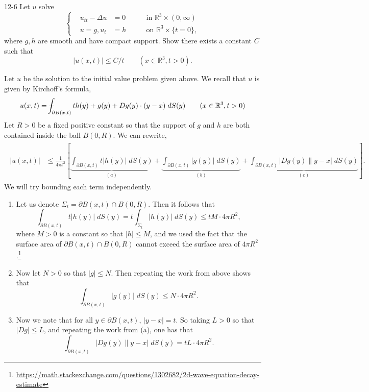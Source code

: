 \documentclass{article}
\def\Xint#1{\mathchoice
	{\XXint\displaystyle\textstyle{#1}}%
	{\XXint\textstyle\scriptstyle{#1}}%
	{\XXint\scriptstyle\scriptscriptstyle{#1}}%
	{\XXint\scriptscriptstyle\scriptscriptstyle{#1}}%
	\!\int}
\def\XXint#1#2#3{{\setbox0=\hbox{$#1{#2#3}{\int}$ }
		\vcenter{\hbox{$#2#3$ }}\kern-0.6\wd0}}
\def\dashint{\Xint-}
\numberwithin{equation}{section}
\begin{document}
	\begin{prb}{12-6}
		Let $u$ solve 
		\begin{equation*}
			\left\{
			\begin{alignedat}{3}
				&u_{tt} - \Delta u &=0 &\qquad \text{in $\mathbb{R}^3 \times (0,\infty)$} \\
				&u = g, u_t &= h &\qquad \text{on $\mathbb{R}^3 \times \{t = 0\}$},
			\end{alignedat}
			\right.
		\end{equation*}
		where $g, h$ are smooth and have compact support. Show there exists a constant $C$ such that 
		\begin{equation*}
			|u(x,t)| \leq C/t \qquad (x \in \mathbb{R}^3, t > 0). 
		\end{equation*}
	\end{prb}
	Let $u$ be the solution to the initial value problem given above. We recall that $u$ is given by Kirchoff's formula, 
	\begin{equation*}
		u(x,t) = \dashint_{\partial B(x,t)}th(y) + g(y) + Dg(y) \cdot (y - x)\;dS(y) \qquad (x \in \mathbb{R}^3, t > 0)
	\end{equation*}
	Let $R > 0$ be a fixed positive constant so that the support of $g$ and $h$ are both contained inside the ball $B(0,R)$. We can rewrite, 
	\begin{align*}
		\begin{split}
			|u(x,t)| &\leq \frac{1}{4\pi t^2}\left[\underbrace{\int_{\partial B(x,t)}t|h(y)|\;dS(y)}_{(a)} + \underbrace{\int_{\partial B(x,t)}|g(y)|\;dS(y)}_{(b)} + \underbrace{\int_{\partial B(x,t)}|Dg(y)\|y-x|\;dS(y)}_{(c)}\right]. 
		\end{split}
	\end{align*}
	We will try bounding each term independently. 
	\begin{enumerate}[itemsep =-2pt,label = (\alph{*})]
		\item Let us denote $\Sigma_t = \partial B(x,t) \cap B(0,R)$. Then it follows that 
		\begin{equation*}
			\int_{\partial B(x,t)}t|h(y)|\;dS(y) = t\int_{\Sigma_t}|h(y)|\;dS(y) \leq tM\cdot 4\pi R^2, 
		\end{equation*}
		where $M > 0$ is a constant so that $|h|\leq M$, and we used the fact that the surface area of $\partial B(x,t) \cap B(0,R)$ cannot exceed the surface area of $4\pi R^2$.\footnote{\href{https://math.stackexchange.com/questions/1302682/2d-wave-equation-decay-estimate}{https://math.stackexchange.com/questions/1302682/2d-wave-equation-decay-estimate}} 
		\item Now let $N > 0$ so that $|g|\leq N$. Then repeating the work from above shows that 
		\begin{equation*}
			\int_{\partial B(x,t)}|g(y)|\;dS(y) \leq N \cdot 4\pi R^2.
		\end{equation*}
		\item Now we note that for all $y \in \partial B(x,t)$, $|y - x| = t$. So taking $L > 0$ so that $|Dg| \leq L$, and repeating the work from (a), one has that 
		\begin{equation*}
			\int_{\partial B(x,t)}|Dg(y)\|y - x|\;dS(y) = t L \cdot 4\pi R^2. 
		\end{equation*}
	\end{enumerate}
\end{document}
